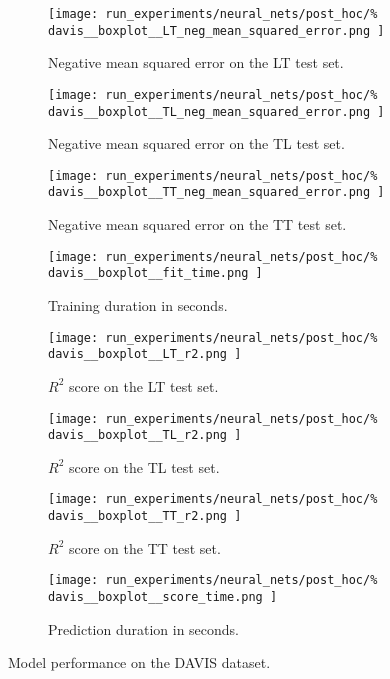 \documentclass[conference]{IEEEtran}
\begin{document}
\begin{figure*}
    \centering
    \begin{subfigure}{0.24\textwidth}
        \texttt{[image: 
            run\_experiments/neural\_nets/post\_hoc/\%
            davis\_\_boxplot\_\_LT\_neg\_mean\_squared\_error.png
        ]}
        \caption{Negative mean squared error on the LT test set.}
    \end{subfigure}
    \begin{subfigure}{0.24\textwidth}
        \texttt{[image: 
            run\_experiments/neural\_nets/post\_hoc/\%
            davis\_\_boxplot\_\_TL\_neg\_mean\_squared\_error.png
        ]}
        \caption{Negative mean squared error on the TL test set.}
    \end{subfigure}
    \begin{subfigure}{0.24\textwidth}
        \texttt{[image: 
            run\_experiments/neural\_nets/post\_hoc/\%
            davis\_\_boxplot\_\_TT\_neg\_mean\_squared\_error.png
        ]}
        \caption{Negative mean squared error on the TT test set.}
    \end{subfigure}
    \begin{subfigure}{0.24\textwidth}
        \texttt{[image: 
            run\_experiments/neural\_nets/post\_hoc/\%
            davis\_\_boxplot\_\_fit\_time.png
        ]}
        \caption{Training duration in seconds.}
    \end{subfigure}

    \begin{subfigure}{0.24\textwidth}
        \texttt{[image: 
            run\_experiments/neural\_nets/post\_hoc/\%
            davis\_\_boxplot\_\_LT\_r2.png
        ]}
        \caption{$R^2$ score on the LT test set.}
    \end{subfigure}
    \begin{subfigure}{0.24\textwidth}
        \texttt{[image: 
            run\_experiments/neural\_nets/post\_hoc/\%
            davis\_\_boxplot\_\_TL\_r2.png
        ]}
        \caption{$R^2$ score on the TL test set.}
    \end{subfigure}
    \begin{subfigure}{0.24\textwidth}
        \texttt{[image: 
            run\_experiments/neural\_nets/post\_hoc/\%
            davis\_\_boxplot\_\_TT\_r2.png
        ]}
        \caption{$R^2$ score on the TT test set.}
    \end{subfigure}
    \begin{subfigure}{0.24\textwidth}
        \texttt{[image: 
            run\_experiments/neural\_nets/post\_hoc/\%
            davis\_\_boxplot\_\_score\_time.png
        ]}
        \caption{Prediction duration in seconds.}
    \end{subfigure}

    \caption{Model performance on the DAVIS dataset.}
    \label{fig:davis_mse}
\end{figure*}
\end{document}
